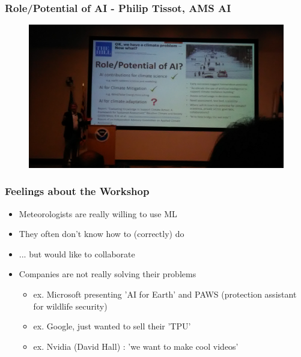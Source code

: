 \documentclass{beamer}
\begin{document}
\begin{frame}
\frametitle{Role/Potential of AI - Philip Tissot, AMS AI}
\begin{figure}
	\includegraphics[width=\linewidth]{figs/P_20190423_105016.jpg}
\end{figure}
\end{frame}



\begin{frame}
\frametitle{Feelings about the Workshop}

\begin{itemize}
	\item Meteorologists are really willing to use ML
	\item They often don't know how to (correctly) do
	\item ... but would like to collaborate
	\item Companies are not really solving their problems
		\begin{itemize}
			\item ex. Microsoft presenting 'AI for Earth' and PAWS (protection assistant for wildlife security)
			\item ex. Google, just wanted to sell their 'TPU'
			\item ex. Nvidia (David Hall) : 'we want to make cool videos' 
		\end{itemize}
\end{itemize}
\end{frame}
\end{document}
